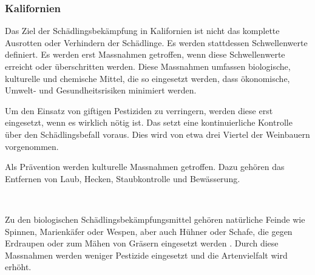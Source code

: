 \subsubsection{Kalifornien}
\label{sub:sch_dlingsbek_mpfung}

Das Ziel der Schädlingsbekämpfung in Kalifornien ist nicht das komplette Ausrotten oder Verhindern
der Schädlinge. Es werden stattdessen Schwellenwerte definiert. Es werden erst Massnahmen getroffen,
wenn diese Schwellenwerte erreicht oder überschritten werden. Diese Massnahmen umfassen biologische,
kulturelle und chemische Mittel, die so eingesetzt werden, dass ökonomische, Umwelt- und
Gesundheitsrisiken minimiert werden.

Um den Einsatz von giftigen Pestiziden zu verringern, werden diese erst eingesetzt, wenn es wirklich
nötig ist. Das setzt eine kontinuierliche Kontrolle über den Schädlingsbefall voraus. Dies wird von
etwa drei Viertel der Weinbauern vorgenommen.

Als Prävention werden kulturelle Massnahmen getroffen. Dazu gehören das Entfernen von Laub, Hecken,
Staubkontrolle und Bewässerung.

\cite{_2015_cswa_sustainability_report.pdf}\\
\cite{_2015_report_appendix.pdf}


Zu den biologischen Schädlingsbekämpfungsmittel gehören natürliche Feinde wie Spinnen, Marienkäfer
oder Wespen, aber auch Hühner oder Schafe, die gegen Erdraupen oder zum Mähen von Gräsern eingesetzt
werden \cite{_sustainable}.  Durch diese Massnahmen werden weniger
Pestizide eingesetzt und die Artenvielfalt wird erhöht.

